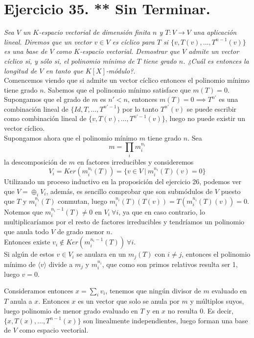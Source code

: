 \section{Ejercicio 35. ** Sin Terminar.} \textit{Sea \(V\) un \(K\)-espacio
  vectorial de dimensión finita \(n\) y \(T:V \to V\) una
  aplicación lineal. Diremos que un vector \(v \in V\) es cíclico para
  \(T\) si \(\{v, T(v), \dots, T^{n-1}(v)\}\) es una base de \(V\)
  como \(K\)-espacio vectorial. Demostrar que \(V\) admite un vector cíclico si,
  y sólo si, el polinomio mínimo de \(T\) tiene grado \(n\). ¿Cuál es entonces
  la longitud de \(V\) en tanto que \(K[X]\)-módulo?.}\\


Comencemos viendo que si admite un vector cíclico entonces el polinomio mínimo
tiene grado \(n\). Sabemos que el polinomio mínimo satisface que \(m(T)=0\). Supongamos que el
grado de \(m\) es \(n' < n\),  entonces \(m(T)=0 \implies T^{n'}\) es una
combinación lineal de \(\{Id,T,\dots,T^{n'-1}\}\) por lo tanto \(T^{n'}(v)\) se
puede escribir como combinación lineal de \(\{v,T(v),\dots,T^{n'-1}(v)\}\),
luego no puede existir un vector cíclico.\\

Supongamos ahora que el polinomio mínimo \(m\) tiene grado \(n\). Sea
\[
  m = \prod_i m_i^{n_i}
\]
la descomposición de \(m\) en factores irreducibles y consideremos
\[
  V_i = Ker(m_i^{n_i}(T)) = \{v \in V \ | \ m_i^{n_i}(T)(v) = 0\}
\]
Utilizando un proceso inductivo en la proposición del ejercicio 26, podemos ver
que \(V = \oplus_i V_i\), además, es sencillo comprobar que son submódulos de \(V\) puesto que \(T\) y \(m_i^{n_i}(T)\)
conmutan, luego \(m_i^{n_i}(T)(T(v)) = T(m_i^{n_i}(T)(v)) = 0\).
Notemos que \(m_i^{n_i - 1}(T) \neq 0\) en \(V_i \ \forall i\), ya que en caso
contrario, lo multiplicaríamos por el resto de factores irreducibles y
tendríamos un polinomio que anula todo \(V\) de grado menor \(n\).\\

Entonces existe \(v_i \not \in Ker(m_i^{n_i-1}(T)) \ \forall i\).\\

Si algún de estos \(v \in V_i\) se anulara en un \(m_j(T)\) con \(i \neq j\),
entonces el polinomio mínimo de \(\langle v \rangle\) divide a \(m_j\) y
\(m_i^{n_i}\), que como son primos relativos resulta ser 1, luego \(v = 0\).

Consideramos entonces \(x = \sum_i v_i\), tenemos que ningún divisor de \(m\)
evaluado en \(T\) anula a \(x\). Entonces \(x\) es un vector que solo se anula
por \(m\) y múltiplos suyos, luego polinomio de menor grado evaluado en \(T\) y
en \(x\) no resulta 0. Es decir, \(\{x, T(x), \dots, T^{n-1}(x)\}\)
son linealmente independientes, luego forman una base de \(V\) como espacio
vectorial.
